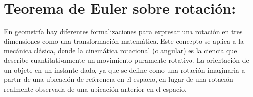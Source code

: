 \documentclass[12pt,a4paper]{article}
\begin{document}
\tableofcontents

\section{Teorema de Euler sobre rotación:}
En geometría hay diferentes formalizaciones para expresar una rotación en tres dimensiones como una transformación matemática. Este concepto se aplica a la mecánica clásica, donde la cinemática rotacional (o angular) es la ciencia que describe cuantitativamente un movimiento puramente rotativo. La orientación de un objeto en un instante dado, ya que se define como una rotación imaginaria a partir de una ubicación de referencia en el espacio, en lugar de una rotación realmente observada de una ubicación anterior en el espacio.\\
\end{document}
